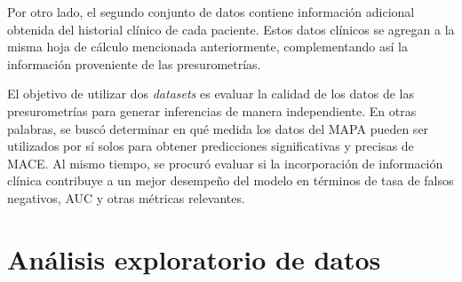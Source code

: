 Por otro lado, el segundo conjunto de datos contiene información adicional obtenida 
del historial clínico de cada paciente. Estos datos clínicos se agregan a la misma 
hoja de cálculo mencionada anteriormente, complementando así la información proveniente 
de las presurometrías.

El objetivo de utilizar dos \emph{datasets} es evaluar la calidad de los datos de 
las presurometrías para generar inferencias de manera independiente. En otras palabras, 
se buscó determinar en qué medida los datos del MAPA pueden ser utilizados por sí solos 
para obtener predicciones significativas y precisas de MACE. Al mismo tiempo, se procuró 
evaluar si la incorporación de información clínica contribuye a un mejor desempeño del 
modelo en términos de tasa de falsos negativos, AUC y otras métricas relevantes.



\section{Análisis exploratorio de datos}
 
